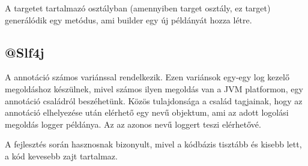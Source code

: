 A targetet tartalmazó osztályban (amennyiben target osztály, ez target)  generálódik egy  metódus, ami builder egy új példányát hozza létre. \par


\subsection{@Slf4j}

A  annotáció számos variánssal rendelkezik. Ezen variánsok egy-egy log kezelő megoldáshoz készülnek, mivel számos ilyen megoldás van a JVM platformon, egy annotáció családról beszéhetünk. Közös tulajdonsága a család tagjainak, hogy az annotáció elhelyezése után elérhető egy  nevű objektum, ami az adott logolási megoldás logger példánya. Az  az azonos nevű loggert teszi elérhetővé. \par

A fejlesztés során hasznosnak bizonyult, mivel a kódbázis tisztább és kisebb lett, a kód kevesebb zajt tartalmaz.




